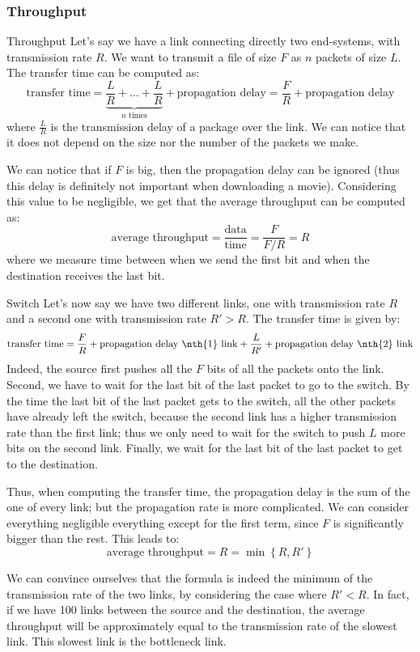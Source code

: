 \documentclass[a4paper]{article}
\begin{document}
\subsubsection{Throughput}
\begin{parag}{Throughput}
    Let's say we have a link connecting directly two end-systems, with transmission rate $R$. We want to transmit a file of size $F$ as $n$ packets of size $L$. The transfer time can be computed as:
    \[\text{transfer time} = \underbrace{\frac{L}{R} + \ldots + \frac{L}{R}}_{n \text{ times}} + \text{propagation delay} = \frac{F}{R} + \text{propagation delay}\]
    where $\frac{L}{R}$ is the transmission delay of a package over the link. We can notice that it does not depend on the size nor the number of the packets we make.

    We can notice that if $F$ is big, then the propagation delay can be ignored (thus this delay is definitely not important when downloading a movie). Considering this value to be negligible, we get that the average throughput can be computed as:
    \[\text{average throughput} = \frac{\text{data}}{\text{time}} = \frac{F}{F / R} = R\]
    where we measure time between when we send the first bit and when the destination receives the last bit.
\end{parag}

\begin{parag}{Switch}
    Let's now say we have two different links, one with transmission rate $R$ and a second one with transmission rate $R' > R$. The transfer time is given by:
    \[\text{transfer time} = \frac{F}{R} + \text{propagation delay \nth{1} link} + \frac{L}{R'} + \text{propagation delay \nth{2} link}\]
    Indeed, the source first pushes all the $F$ bits of all the packets onto the  link. Second, we have to wait for the last bit of the last packet to go to the switch. By the time the last bit of the last packet gets to the switch, all the other packets have already left the switch, because the second link has a higher transmission rate than the first link; thus we only need to wait for the switch to push $L$ more bits on the second link. Finally, we wait for the last bit of the last packet to get to the destination.

    Thus, when computing the transfer time, the propagation delay is the sum of the one of every link; but the propagation rate is more complicated. We can consider everything negligible everything except for the first term, since $F$ is significantly bigger than the rest. This leads to:
    \[\text{average throughput} = R = \min\left\{R, R'\right\}\]

    We can convince ourselves that the formula is indeed the minimum of the transmission rate of the two links, by considering the case where $R' < R$. In fact, if we have 100 links between the source and the destination, the average throughput will be approximately equal to the transmission rate of the slowest link. This slowest link is the bottleneck link.
\end{parag}
\end{document}
